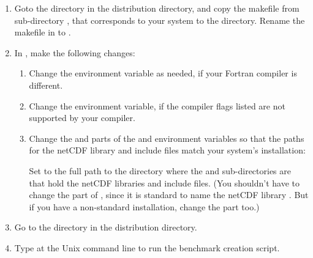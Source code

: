 \begin{enumerate}
\item Goto the directory  in the
	\fn{} distribution directory,
	and copy the makefile from sub-directory ,
	that corresponds to your system to the
	 directory.  Rename the makefile 
	in  to .

\item In , make the following changes:
        \begin{enumerate}
        \item Change the  environment variable as needed,
                if your Fortran compiler is different.
        \item Change the  environment variable, if the
                compiler flags listed are not supported by your
                compiler.
        \item Change the  and  parts of the
                 and  environment
                variables so that the paths for the netCDF library and
                include files match your system's installation:
                \begin{codeblock}
                \end{codeblock}
                Set  to the full path to the
                 directory where the  and
                 sub-directories are that hold the netCDF
                libraries and include files.
                (You shouldn't have to change the  part of
                , since it is standard to name the netCDF
                library .  But if you have a non-standard
                installation, change the  part too.)
        \end{enumerate}

\item Go to the directory  in the
	\fn{} distribution directory.

\item Type  at the Unix command line
	to run the benchmark creation script.
\end{enumerate}

